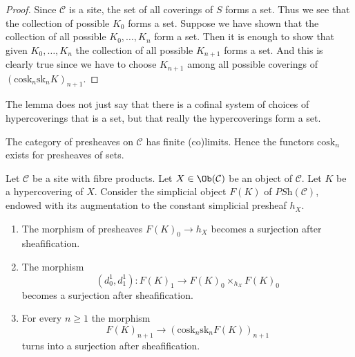 \begin{proof}
Since $\mathcal{C}$ is a site, the set of all coverings of
$S$ forms a set. Thus we see that the collection
of possible $K_0$ forms a set. Suppose we have shown that
the collection of all possible $K_0, \ldots, K_n$ form
a set. Then it is enough to show that given
$K_0, \ldots, K_n$ the collection of all possible
$K_{n + 1}$ forms a set. And this is clearly true since
we have to choose $K_{n + 1}$ among all possible coverings
of $(\text{cosk}_n \text{sk}_n K)_{n + 1}$.
\end{proof}

\begin{remark}
\label{remark-hypercoverings-really-set}
The lemma does not just say that there is a cofinal
system of choices of hypercoverings that is a set,
but that really the hypercoverings form a set.
\end{remark}

\noindent
The category of presheaves on $\mathcal{C}$ has
finite (co)limits. Hence the functors $\text{cosk}_n$
exists for presheaves of sets.

\begin{lemma}
\label{lemma-hypercovering-F}
Let $\mathcal{C}$ be a site with fibre products.
Let $X \in \Ob(\mathcal{C})$ be an object of $\mathcal{C}$.
Let $K$ be a hypercovering of $X$.
Consider the simplicial object $F(K)$ of $\textit{PSh}(\mathcal{C})$,
endowed with its augmentation to the constant simplicial presheaf $h_X$.
\begin{enumerate}
\item The morphism of presheaves $F(K)_0 \to h_X$ becomes
a surjection after sheafification.
\item The morphism
$$
(d^1_0, d^1_1) :
F(K)_1
\longrightarrow
F(K)_0 \times_{h_X} F(K)_0
$$
becomes a surjection after sheafification.
\item For every $n \geq 1$ the morphism
$$
F(K)_{n + 1} \longrightarrow (\text{cosk}_n \text{sk}_n F(K))_{n + 1}
$$
turns into a surjection after sheafification.
\end{enumerate}
\end{lemma}

